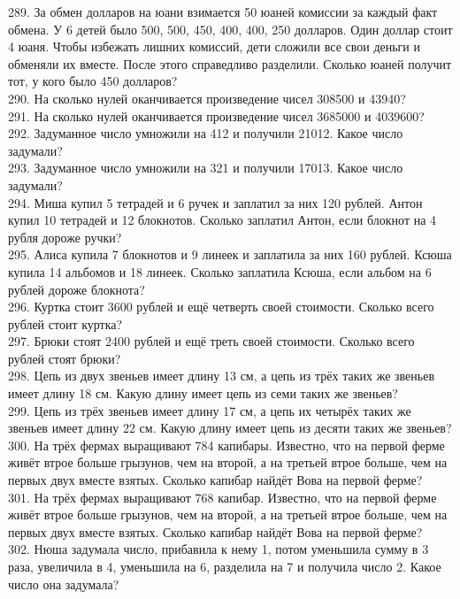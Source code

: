 289. За обмен долларов на юани взимается 50 юаней комиссии за каждый факт обмена. У 6 детей было 500, 500, 450, 400, 400, 250 долларов. Один доллар стоит 4 юаня. Чтобы избежать лишних комиссий, дети сложили все свои деньги и обменяли их вместе. После этого справедливо разделили. Сколько юаней получит тот, у кого было 450 долларов?\\
290. На сколько нулей оканчивается произведение чисел 308500 и 43940?\\
291. На сколько нулей оканчивается произведение чисел 3685000 и 4039600?\\
292. Задуманное число умножили на 412 и получили 21012. Какое число задумали?\\
293. Задуманное число умножили на 321 и получили 17013. Какое число задумали?\\
294. Миша купил 5 тетрадей и 6 ручек и заплатил за них 120 рублей. Антон купил 10 тетрадей и 12 блокнотов. Сколько заплатил Антон, если блокнот на 4 рубля дороже ручки?\\
295. Алиса купила 7 блокнотов и 9 линеек и заплатила за них 160 рублей. Ксюша купила 14 альбомов и 18 линеек. Сколько заплатила Ксюша, если альбом на 6 рублей дороже блокнота?\\
296. Куртка стоит 3600 рублей и ещё четверть своей стоимости. Сколько всего рублей стоит куртка?\\
297. Брюки стоят 2400 рублей и ещё треть своей стоимости. Сколько всего рублей стоят брюки?\\
298. Цепь из двух звеньев имеет длину 13 см, а цепь из трёх таких же звеньев имеет длину 18 см. Какую длину имеет цепь из семи таких же звеньев?\\
299. Цепь из трёх звеньев имеет длину 17 см, а цепь их четырёх таких же звеньев имеет длину 22 см. Какую длину имеет цепь из десяти таких же звеньев?\\
300. На трёх фермах выращивают 784 капибары. Известно, что на первой ферме живёт втрое больше грызунов, чем на второй, а на третьей втрое больше, чем на первых двух вместе взятых. Сколько капибар найдёт Вова на первой ферме?\\
301. На трёх фермах выращивают 768 капибар. Известно, что на первой ферме живёт втрое больше грызунов, чем на второй, а на третьей втрое больше, чем на первых двух вместе взятых. Сколько капибар найдёт Вова на первой ферме?\\
302. Нюша задумала число, прибавила к нему 1, потом уменьшила сумму в 3 раза, увеличила в 4, уменьшила на 6, разделила на 7 и получила число 2. Какое число она задумала?\\
